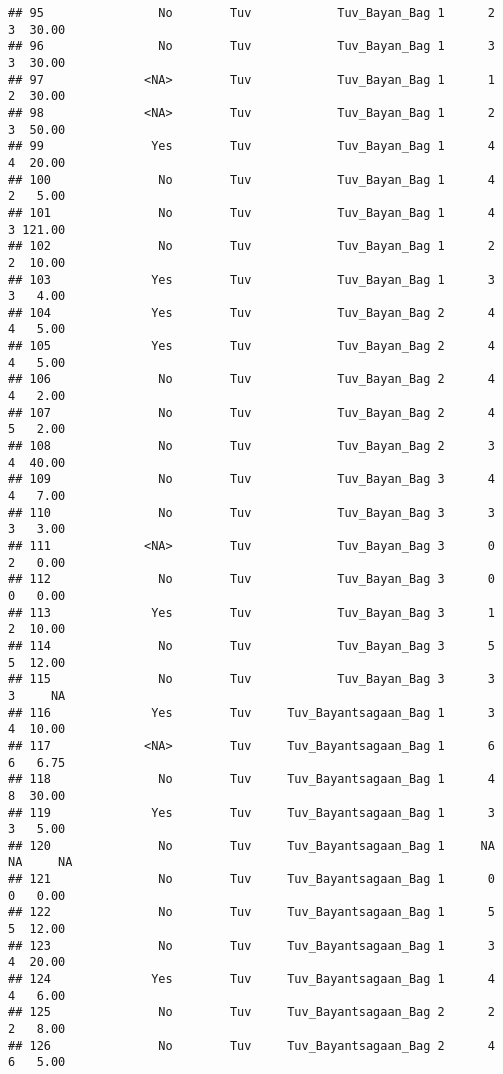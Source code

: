 \documentclass[
]{article}
\begin{document}
\begin{verbatim}
## 95                No        Tuv            Tuv_Bayan_Bag 1      2      3  30.00
## 96                No        Tuv            Tuv_Bayan_Bag 1      3      3  30.00
## 97              <NA>        Tuv            Tuv_Bayan_Bag 1      1      2  30.00
## 98              <NA>        Tuv            Tuv_Bayan_Bag 1      2      3  50.00
## 99               Yes        Tuv            Tuv_Bayan_Bag 1      4      4  20.00
## 100               No        Tuv            Tuv_Bayan_Bag 1      4      2   5.00
## 101               No        Tuv            Tuv_Bayan_Bag 1      4      3 121.00
## 102               No        Tuv            Tuv_Bayan_Bag 1      2      2  10.00
## 103              Yes        Tuv            Tuv_Bayan_Bag 1      3      3   4.00
## 104              Yes        Tuv            Tuv_Bayan_Bag 2      4      4   5.00
## 105              Yes        Tuv            Tuv_Bayan_Bag 2      4      4   5.00
## 106               No        Tuv            Tuv_Bayan_Bag 2      4      4   2.00
## 107               No        Tuv            Tuv_Bayan_Bag 2      4      5   2.00
## 108               No        Tuv            Tuv_Bayan_Bag 2      3      4  40.00
## 109               No        Tuv            Tuv_Bayan_Bag 3      4      4   7.00
## 110               No        Tuv            Tuv_Bayan_Bag 3      3      3   3.00
## 111             <NA>        Tuv            Tuv_Bayan_Bag 3      0      2   0.00
## 112               No        Tuv            Tuv_Bayan_Bag 3      0      0   0.00
## 113              Yes        Tuv            Tuv_Bayan_Bag 3      1      2  10.00
## 114               No        Tuv            Tuv_Bayan_Bag 3      5      5  12.00
## 115               No        Tuv            Tuv_Bayan_Bag 3      3      3     NA
## 116              Yes        Tuv     Tuv_Bayantsagaan_Bag 1      3      4  10.00
## 117             <NA>        Tuv     Tuv_Bayantsagaan_Bag 1      6      6   6.75
## 118               No        Tuv     Tuv_Bayantsagaan_Bag 1      4      8  30.00
## 119              Yes        Tuv     Tuv_Bayantsagaan_Bag 1      3      3   5.00
## 120               No        Tuv     Tuv_Bayantsagaan_Bag 1     NA     NA     NA
## 121               No        Tuv     Tuv_Bayantsagaan_Bag 1      0      0   0.00
## 122               No        Tuv     Tuv_Bayantsagaan_Bag 1      5      5  12.00
## 123               No        Tuv     Tuv_Bayantsagaan_Bag 1      3      4  20.00
## 124              Yes        Tuv     Tuv_Bayantsagaan_Bag 1      4      4   6.00
## 125               No        Tuv     Tuv_Bayantsagaan_Bag 2      2      2   8.00
## 126               No        Tuv     Tuv_Bayantsagaan_Bag 2      4      6   5.00

\end{verbatim}
\end{document}
